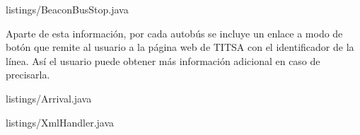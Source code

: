 
{listings/BeaconBusStop.java} %


Aparte de esta información, por cada autobús se incluye un enlace a modo de botón que remite al usuario a la página web de TITSA con el identificador de la línea. Así el usuario puede obtener más información adicional en caso de precisarla.


{listings/Arrival.java} %

\vspace{5mm}

{listings/XmlHandler.java} %





